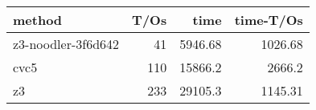 \begin{tabular}{lrrr}
\hline
 method             &   T/Os &     time &   time-T/Os \\
\hline
 z3-noodler-3f6d642 &     41 &  5946.68 &     1026.68 \\
 cvc5               &    110 & 15866.2  &     2666.2  \\
 z3                 &    233 & 29105.3  &     1145.31 \\
\hline
\end{tabular}
